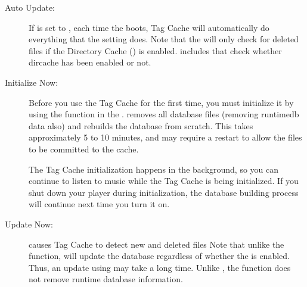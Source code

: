 \begin{description}
  
\item[Auto Update:  ]
  If  is set to , each time the \dap{}
  boots, Tag Cache will automatically do everything that the 
   setting does.  Note that the  will only check for deleted files if the Directory Cache
  () is enabled.  
   includes that check whether dircache has been enabled or
  not.
  
\item[Initialize Now:  ]
  Before you use the Tag Cache for the first time, you must initialize it by 
  using the  function in the .   removes all database files (removing 
  runtimedb data also) and rebuilds the database from scratch. This takes 
  approximately 5 to 10 minutes, and may require a restart to allow the 
  files to be committed to the cache. 
  
  The Tag Cache initialization happens in the background, so you can continue 
  to listen to music while the Tag Cache is being initialized.  If you shut 
  down your player during initialization, the database building process will 
  continue next time you turn it on.
  
\item[Update Now:  ]
   causes Tag Cache to detect new and deleted files 
  Note that unlike the  function,  
  will update the database regardless of whether the 
  is enabled.  Thus, an update using  may take a long
  time.  Unlike , the  function 
  does not remove runtime database information.
  

\end{description}
